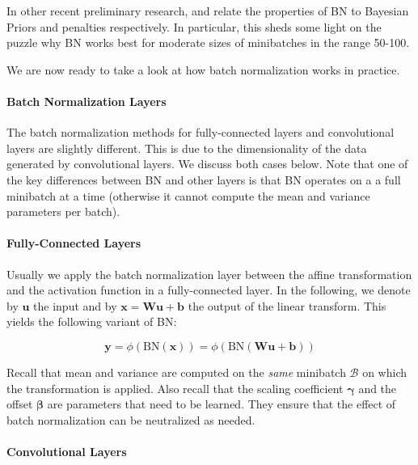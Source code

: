 In other recent preliminary research, \citet{Teye2018} and \citet{Luo2019} relate the properties of BN to Bayesian Priors and penalties respectively. 
In particular, this sheds some light on the puzzle why BN works best for moderate sizes of minibatches in the range 50-100.

We are now ready to take a look at how batch normalization works in practice.

\paragraph{Batch Normalization Layers}

The batch normalization methods for fully-connected layers and convolutional layers are slightly different. This is due to the dimensionality of the data 
generated by convolutional layers. We discuss both cases below. Note that one of the key differences between BN and other layers is that BN operates on a a full minibatch at a time (otherwise it cannot compute the mean and variance parameters per batch).

\paragraph{Fully-Connected Layers}

Usually we apply the batch normalization layer between the affine transformation and the activation function in a fully-connected layer. In the following, we denote by $\mathbf{u}$ the input and by $\mathbf{x} = \mathbf{W}\mathbf{u} + \mathbf{b}$ the output of the linear transform. This yields the following variant of BN:

$$\mathbf{y} = \phi(\mathrm{BN}(\mathbf{x})) =  \phi(\mathrm{BN}(\mathbf{W}\mathbf{u} + \mathbf{b}))$$

Recall that mean and variance are computed on the \textit{same} minibatch $\mathcal{B}$ on which the transformation is applied. Also recall that the scaling coefficient $\mathbf{\gamma}$ and the offset $\mathbf{\beta}$ are parameters that need to be learned. They ensure that the effect of batch normalization can be neutralized as needed.

\paragraph{Convolutional Layers}

